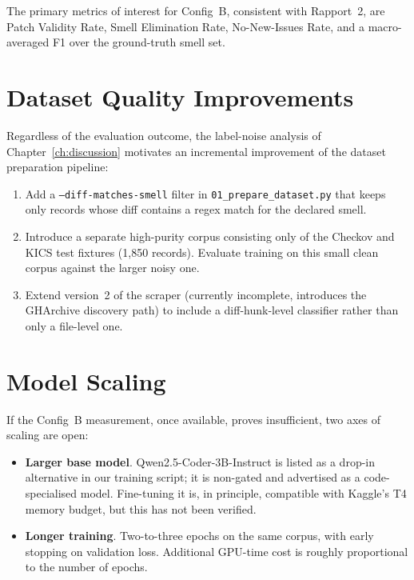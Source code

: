 \documentclass[12pt, a4paper]{report}
\begin{document}
The primary metrics of interest for Config~B, consistent with Rapport~2,
are Patch Validity Rate, Smell Elimination Rate, No-New-Issues Rate,
and a macro-averaged F1 over the ground-truth smell set.

\section{Dataset Quality Improvements}

Regardless of the evaluation outcome, the label-noise analysis of
Chapter~\ref{ch:discussion} motivates an incremental improvement of the
dataset preparation pipeline:

\begin{enumerate}
  \item Add a \texttt{--diff-matches-smell} filter in
        \texttt{01\_prepare\_dataset.py} that keeps only records whose
        diff contains a regex match for the declared smell.
  \item Introduce a separate high-purity corpus consisting only of the
        Checkov and KICS test fixtures (1{,}850 records). Evaluate
        training on this small clean corpus against the larger noisy
        one.
  \item Extend version~2 of the scraper (currently incomplete, introduces
        the GHArchive discovery path) to include a diff-hunk-level
        classifier rather than only a file-level one.
\end{enumerate}

\section{Model Scaling}

If the Config~B measurement, once available, proves insufficient, two
axes of scaling are open:

\begin{itemize}
  \item \textbf{Larger base model}. Qwen2.5-Coder-3B-Instruct is
        listed as a drop-in alternative in our training script; it is
        non-gated and advertised as a code-specialised model.
        Fine-tuning it is, in principle, compatible with Kaggle's T4
        memory budget, but this has not been verified.
  \item \textbf{Longer training}. Two-to-three epochs on the same
        corpus, with early stopping on validation loss. Additional
        GPU-time cost is roughly proportional to the number of epochs.
\end{itemize}
\end{document}
